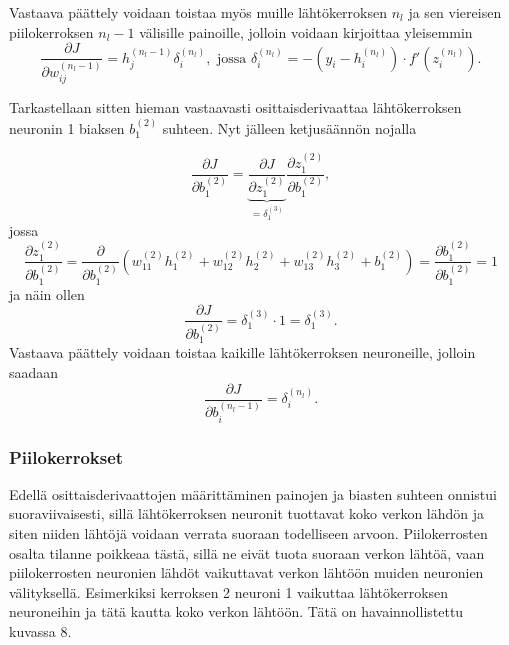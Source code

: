 \documentclass[12pt,a4paper,finnish,oneside,titlepage]{article}
\theoremstyle{plain}
\theoremstyle{definition}
\theoremstyle{remark}
\begin{document}
Vastaava päättely voidaan toistaa myös muille lähtökerroksen \(n_l\) ja sen viereisen piilokerroksen \(n_l-1\) välisille painoille, jolloin voidaan kirjoittaa yleisemmin \[\frac{\partial J}{\partial w_{ij}^{(n_l-1)}}=h_j^{(n_l-1)}\delta_i^{(n_l)},\text{ jossa } \delta_i^{(n_l)}=-(y_i-h_i^{(n_l)})\cdot f'(z_i^{(n_l)}).\]

Tarkastellaan sitten hieman vastaavasti osittaisderivaattaa lähtökerroksen neuronin 1 biaksen \(b_1^{(2)}\) suhteen. Nyt jälleen ketjusäännön nojalla

\[\frac{\partial J}{\partial b_{1}^{(2)}}=\underbrace{\frac{\partial J}{\partial z_1^{(2)}}}_{=\delta_1^{(3)}} \frac{\partial z_1^{(2)}}{\partial b_1^{(2)}},\] jossa \[\frac{\partial z_1^{(2)}}{\partial b_1^{(2)}}=\frac{\partial}{\partial b_1^{(2)}} (w_{11}^{(2)}h_1^{(2)}+w_{12}^{(2)}h_2^{(2)}+w_{13}^{(2)}h_3^{(2)}+b_1^{(2)})=\frac{\partial b_1^{(2)}}{\partial b_1^{(2)}}=1\] ja näin ollen \[\frac{\partial J}{\partial b_1^{(2)}}=\delta_1^{(3)}\cdot 1=\delta_1^{(3)}.\] Vastaava päättely voidaan toistaa kaikille lähtökerroksen neuroneille, jolloin saadaan \[\frac{\partial J}{\partial b_{i}^{(n_l-1)}}=\delta_i^{(n_l)}.\]

\subsubsection{Piilokerrokset}
Edellä osittaisderivaattojen määrittäminen painojen ja biasten suhteen onnistui suoraviivaisesti, sillä lähtökerroksen neuronit tuottavat koko verkon lähdön ja siten niiden lähtöjä voidaan verrata suoraan todelliseen arvoon. Piilokerrosten osalta tilanne poikkeaa tästä, sillä ne eivät tuota suoraan verkon lähtöä, vaan piilokerrosten neuronien lähdöt vaikuttavat verkon lähtöön muiden neuronien välityksellä. Esimerkiksi kerroksen 2 neuroni 1 vaikuttaa lähtökerroksen neuroneihin ja tätä kautta koko verkon lähtöön. Tätä on havainnollistettu kuvassa 8.
\end{document}

